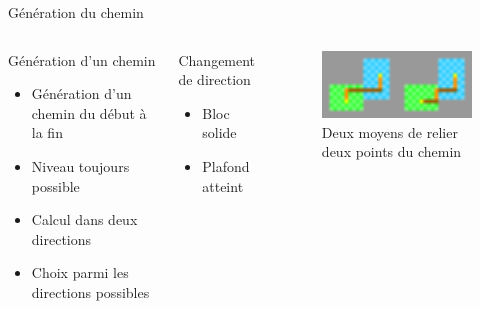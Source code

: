 \documentclass{beamer}
\begin{document}
{\begin{frame}{Génération du chemin}
    \begin{columns}
        \begin{block}{Génération d'un chemin}
            \begin{itemize}
                \item[\bullet] Génération d'un chemin du début à la fin
                \item[\bullet] Niveau toujours possible
                \item[\bullet] Calcul dans deux directions
                \item[\bullet] Choix parmi les directions possibles
            \end{itemize}
        \end{block}
        \begin{block}{Changement de direction}
            \begin{itemize}
                \item[\bullet] Bloc solide
                \item[\bullet] Plafond atteint
            \end{itemize}
        \end{block}
        \begin{figure}
            \centering
            \includegraphics[width=1.0\textwidth]{two_ways_to_connect}
            \caption{Deux moyens de relier deux points du chemin}
        \end{figure}
    \end{columns}
\end{frame}

}
\end{document}
